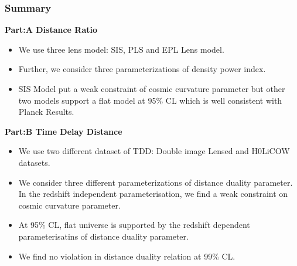 \documentclass[10pt,xcolor={dvipsnames}]{beamer}
\begin{document}
\begin{frame}
 \frametitle{Summary}
\begin{center}
 \textbf{Part:A Distance Ratio}
\end{center}
\begin{itemize}
\item 
We use three lens model: SIS, PLS and EPL Lens model.
\item
Further, we consider three parameterizations of density power index.
\item
SIS Model put a weak constraint of cosmic curvature parameter but other two models support a flat model at 95\% CL which is well consistent with Planck Results.
\end{itemize}
\begin{center}
 \textbf{Part:B Time Delay Distance}
\end{center}
\begin{itemize}
\item
We use two different dataset of TDD: Double image Lensed and H0LiCOW datasets.
\item 
We consider three different parameterizations of distance duality parameter. In the redshift independent parameterisation, we find a weak constraint on cosmic curvature parameter.
\item
At 95\% CL, flat universe is supported by the redshift dependent parameterisatins of distance duality parameter.
\item
We find no violation in distance duality relation at 99\% CL.

\end{itemize}

\end{frame}
\end{document}
